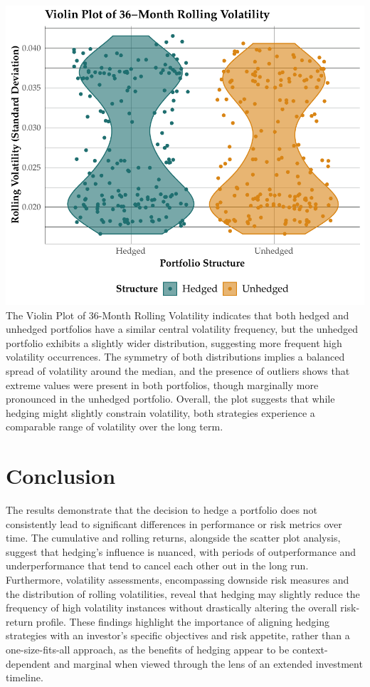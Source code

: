 \documentclass[11pt,preprint, authoryear]{elsarticle}
\numberwithin{equation}{section}
\numberwithin{figure}{section}
\numberwithin{table}{section}
\begin{document}
\includegraphics{Question-2_files/figure-latex/unnamed-chunk-2-1.pdf}
The Violin Plot of 36-Month Rolling Volatility indicates that both
hedged and unhedged portfolios have a similar central volatility
frequency, but the unhedged portfolio exhibits a slightly wider
distribution, suggesting more frequent high volatility occurrences. The
symmetry of both distributions implies a balanced spread of volatility
around the median, and the presence of outliers shows that extreme
values were present in both portfolios, though marginally more
pronounced in the unhedged portfolio. Overall, the plot suggests that
while hedging might slightly constrain volatility, both strategies
experience a comparable range of volatility over the long term.

\hypertarget{conclusion}{%
\section{Conclusion}\label{conclusion}}

The results demonstrate that the decision to hedge a portfolio does not
consistently lead to significant differences in performance or risk
metrics over time. The cumulative and rolling returns, alongside the
scatter plot analysis, suggest that hedging's influence is nuanced, with
periods of outperformance and underperformance that tend to cancel each
other out in the long run. Furthermore, volatility assessments,
encompassing downside risk measures and the distribution of rolling
volatilities, reveal that hedging may slightly reduce the frequency of
high volatility instances without drastically altering the overall
risk-return profile. These findings highlight the importance of aligning
hedging strategies with an investor's specific objectives and risk
appetite, rather than a one-size-fits-all approach, as the benefits of
hedging appear to be context-dependent and marginal when viewed through
the lens of an extended investment timeline.


\end{document}
